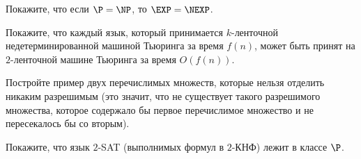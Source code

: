 \begin{task}
   Покажите, что если $\P = \NP$, то $\EXP = \NEXP$. 
\end{task}


\breakline

\begin{ptask}{8}
    Покажите, что каждый язык, который принимается $k$-ленточной недетерминированной машиной Тьюринга за время $f(n)$, может быть
    принят на $2$-ленточной машине Тьюринга за время $O(f(n))$.
\end{ptask}

\begin{ptask}{10}
    Постройте пример двух перечислимых множеств, которые нельзя отделить никаким разрешимым (это значит, что не существует такого
    разрешимого множества, которое содержало бы первое перечислимое множество и не пересекалось бы со вторым).
\end{ptask}

\begin{ptask}{15}
	Покажите, что язык $2$-SAT (выполнимых формул в $2$-КНФ) лежит в классе $\P$. 
\end{ptask}
